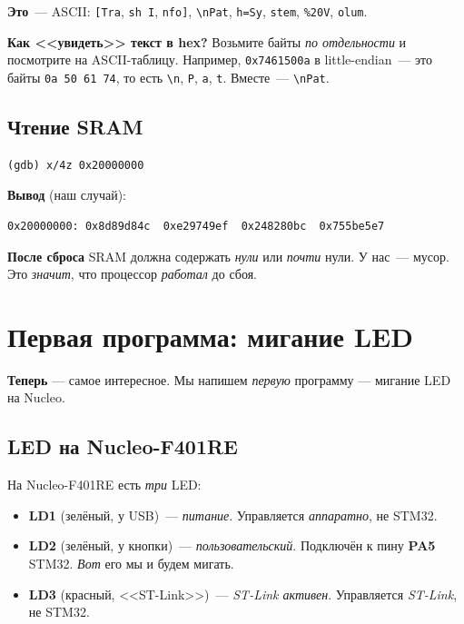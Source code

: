 \textbf{Это}~--- ASCII: \texttt{[Tra}, \texttt{sh I},
\texttt{nfo]}, \texttt{\textbackslash nPat}, \texttt{h=Sy},
\texttt{stem}, \texttt{\%20V}, \texttt{olum}.

\begin{ideabox}
\textbf{Как <<увидеть>> текст в hex?} Возьмите байты
\emph{по отдельности} и посмотрите на ASCII-таблицу.
Например, \texttt{0x7461500a} в little-endian~---
это байты \texttt{0a 50 61 74}, то есть \texttt{\textbackslash n},
\texttt{P}, \texttt{a}, \texttt{t}. Вместе~---
\texttt{\textbackslash nPat}.
\end{ideabox}

\subsection{Чтение SRAM}

\begin{verbatim}
(gdb) x/4z 0x20000000
\end{verbatim}

\textbf{Вывод} (наш случай):

\begin{verbatim}
0x20000000:	0x8d89d84c	0xe29749ef	0x248280bc	0x755be5e7
\end{verbatim}

\textbf{После сброса} SRAM должна содержать \emph{нули}
или \emph{почти} нули. У нас~--- мусор. Это \emph{значит},
что процессор \emph{работал} до сбоя.

\section{Первая программа: мигание LED}
\label{sec:flashing-blink}

\textbf{Теперь} — самое интересное. Мы напишем
\emph{первую} программу — мигание LED на Nucleo.

\subsection{LED на Nucleo-F401RE}

На Nucleo-F401RE есть \emph{три} LED:

\begin{itemize}
    \item \textbf{LD1} (зелёный, у USB)~--- \emph{питание}.
          Управляется \emph{аппаратно}, не STM32.
    \item \textbf{LD2} (зелёный, у кнопки)~--- \emph{пользовательский}.
          Подключён к пину \textbf{PA5} STM32. \emph{Вот}
          его мы и будем мигать.
    \item \textbf{LD3} (красный, <<ST-Link>>)~--- \emph{ST-Link
          активен}. Управляется \emph{ST-Link}, не STM32.
\end{itemize}

